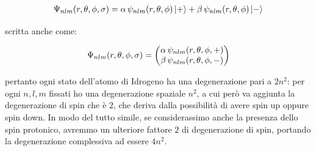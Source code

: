 \begin{align*}
	\Psi_{nlm}\qty(r, \theta, \phi, \sigma) = \alpha \, \psi_{nlm} \qty(r, \theta, \phi) \ket{+} + \beta \, \psi_{nlm}\qty(r, \theta, \phi) \ket{-}
\end{align*}

	scritta anche come:
	
\begin{align*}
	\Psi_{nlm} \qty(r, \theta, \phi, \sigma) = \mqty( \alpha \, \psi_{nlm} \qty(r, \theta, \phi, +) \\  \beta \, \psi_{nlm} \qty(r, \theta, \phi, -) )
\end{align*}

	pertanto ogni stato dell'atomo di Idrogeno ha una degenerazione pari a $2n^2$: per ogni $n, l, m$ fissati ho una degenerazione spaziale $n^2$, a cui però va aggiunta la degenerazione di spin che è $2$, che deriva dalla possibilità di avere spin up oppure spin down. In modo del tutto simile, se considerassimo anche la presenza dello spin protonico, avremmo un ulteriore fattore $2$ di degenerazione di spin, portando la degenerazione complessiva ad essere $4n^2$.






